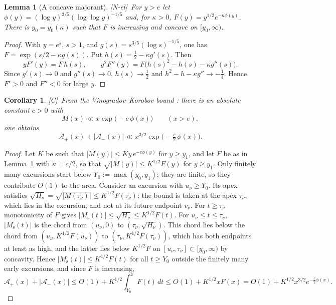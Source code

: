 \documentclass[11pt,reqno]{amsart}
\numberwithin{equation}{section}
\theoremstyle{plain}
\newtheorem{lemma}[theorem]{Lemma}
\newtheorem{corollary}[theorem]{Corollary}
\theoremstyle{definition}
\theoremstyle{remark}
\newcommand{\Ms}{M_{\mathrm{s}}}
\newcommand{\Ap}{\mathcal{A}_{+}}
\newcommand{\Am}{\mathcal{A}_{-}}
\newcommand{\tagNE}{\textup{[N-el]}}
\newcommand{\tagC}{\textup{[C]}}
\begin{document}
\begin{lemma}[A concave majorant]
\label{lem:concave-majorant}
\tagNE\ For $y>e$ let $\phi(y)=(\log y)^{3/5}(\log\log y)^{-1/5}$ and, for
$\kappa>0$, $F(y)=y^{1/2}e^{-\kappa\phi(y)}$. There is $y_0=y_0(\kappa)$ such that $F$
is increasing and concave on $[y_0,\infty)$.
\end{lemma}

\begin{proof}
With $y=e^s$, $s>1$, and $g(s)=s^{3/5}(\log s)^{-1/5}$, one has
$F=\exp(s/2-\kappa g(s))$. Put $h(s)=\frac12-\kappa g'(s)$. Then
\begin{equation}
yF'(y)=F\,h(s),\qquad
y^2F''(y)=F\bigl(h(s)^2-h(s)-\kappa g''(s)\bigr).
\end{equation}
Since $g'(s)\to0$ and $g''(s)\to0$, $h(s)\to\frac12$ and
$h^2-h-\kappa g''\to-\frac14$. Hence $F'>0$ and $F''<0$ for large $y$.
\end{proof}

\begin{corollary}
\label{cor:uncond}
\tagC\ From the Vinogradov--Korobov bound \cite{Walfisz1963}: there is an
absolute constant $c>0$ with
\begin{equation}
\label{eq:VK_M}
  M(x)\ll x\exp\bigl(-c\,\phi(x)\bigr)\qquad(x>e),
\end{equation}
one obtains
\begin{equation}
\label{eq:uncond_area}
  \Ap(x)+|\Am(x)|\ll x^{3/2}\exp\bigl(-\tfrac c2\,\phi(x)\bigr).
\end{equation}
\end{corollary}

\begin{proof}
Let $K$ be such that $|M(y)|\le Ky\,e^{-c\phi(y)}$ for $y\ge y_1$, and let
$F$ be as in Lemma~\ref{lem:concave-majorant} with $\kappa=c/2$, so that
$\sqrt{|M(y)|}\le K^{1/2}F(y)$ for $y\ge y_1$. Only finitely many excursions
start below $Y_0:=\max(y_0,y_1)$; they are finite, so they contribute
$O(1)$ to the area. Consider an excursion with $u_\nu\ge Y_0$. Its apex
satisfies $\sqrt{H_\nu}=\sqrt{|M(\tau_\nu)|}\le K^{1/2}F(\tau_\nu)$; the
bound is taken at the apex $\tau_\nu$, which lies in the excursion, and not
at its future endpoint $v_\nu$. For $t\ge\tau_\nu$ monotonicity of $F$ gives
$|\Ms(t)|\le\sqrt{H_\nu}\le K^{1/2}F(t)$. For $u_\nu\le t\le\tau_\nu$,
$|\Ms(t)|$ is the chord from $(u_\nu,0)$ to $(\tau_\nu,\sqrt{H_\nu})$. This
chord lies below the chord from $(u_\nu,K^{1/2}F(u_\nu))$ to
$(\tau_\nu,K^{1/2}F(\tau_\nu))$, which has both endpoints at least as high,
and the latter lies below $K^{1/2}F$ on $[u_\nu,\tau_\nu]\subset[y_0,\infty)$
by concavity. Hence $|\Ms(t)|\le K^{1/2}F(t)$ for all $t\ge Y_0$ outside the
finitely many early excursions, and since $F$ is increasing,
\begin{equation}
\Ap(x)+|\Am(x)|\le O(1)+K^{1/2}\int_{Y_0}^xF(t)\,dt
\le O(1)+K^{1/2}xF(x)=O(1)+K^{1/2}x^{3/2}e^{-\frac c2\phi(x)}.
\end{equation}
\end{proof}
\end{document}
